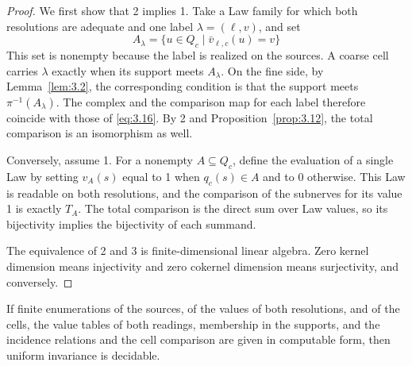\begin{proof}

We first show that 2 implies 1. Take a Law family for which both resolutions are
adequate and one label $\lambda=(\ell,v)$, and set
\begin{equation*}
A_\lambda=\{u\in Q_c\mid\bar v_{\ell,c}(u)=v\}
\tag{3.18}\label{eq:3.18}
\end{equation*}
This set is nonempty because the label is realized on the sources.
A coarse cell carries $\lambda$ exactly when its support meets $A_\lambda$.
On the fine side, by Lemma~\ref{lem:3.2}, the corresponding condition is that the
support meets $\pi^{-1}(A_\lambda)$.
The complex and the comparison map for each label therefore coincide with those of
\eqref{eq:3.16}.
By 2 and Proposition~\ref{prop:3.12}, the total comparison is an isomorphism as well.

Conversely, assume 1. For a nonempty $A\subseteq Q_c$, define the evaluation of a
single Law by setting $v_A(s)$ equal to 1 when $q_c(s)\in A$ and to 0 otherwise.
This Law is readable on both resolutions, and the comparison of the subnerves for
its value 1 is exactly $T_A$.
The total comparison is the direct sum over Law values, so its bijectivity implies
the bijectivity of each summand.

The equivalence of 2 and 3 is finite-dimensional linear algebra.
Zero kernel dimension means injectivity and zero cokernel dimension means
surjectivity, and conversely.

\end{proof}

\begin{proposition}\label{prop:3.23}

If finite enumerations of the sources, of the values of both resolutions, and of the
cells, the value tables of both readings, membership in the supports, and the
incidence relations and the cell comparison are given in computable form, then
uniform invariance is decidable.

\end{proposition}

